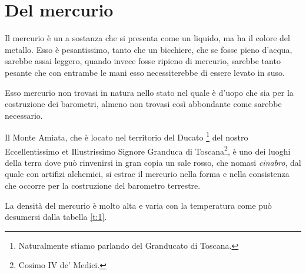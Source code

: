 \documentclass[%
corpo=12pt,
twoside,
tipotesi=magistrale,
]{toptesi}
\begin{document}
\section{Del mercurio}
Il mercurio è un a sostanza che si presenta come un liquido, ma ha il colore
del metallo. Esso è pesantissimo, tanto che un bicchiere, che se fosse pieno
d'acqua, sarebbe assai leggero, quando invece fosse ripieno di mercurio,
sarebbe tanto pesante che con entrambe le mani esso necessiterebbe di essere
levato in suso.

Esso mercurio non trovasi in natura nello stato nel quale è d'uopo che sia
per la costruzione dei barometri, almeno non trovasi così abbondante come
sarebbe necessario.

\setcounter{footnote}{25}

Il Monte Amiata, che è locato nel territorio del Ducato%
\footnote{Naturalmente stiamo parlando del Granducato di Toscana.}
del nostro Eccellentissimo et Illustrissimo Signore Granduca di Toscana\footnote{Cosimo IV de' Medici.}, è uno dei luoghi della terra dove può rinvenirsi in gran copia un sale rosso, che nomasi \emph{cinabro}, dal quale con artifizi alchemici, si estrae il mercurio nella forma e nella consistenza che occorre per la costruzione del barometro terrestre.

La densità del mercurio è molto alta e varia con la temperatura come
può desumersi dalla tabella \ref{t:1}.
\end{document}

